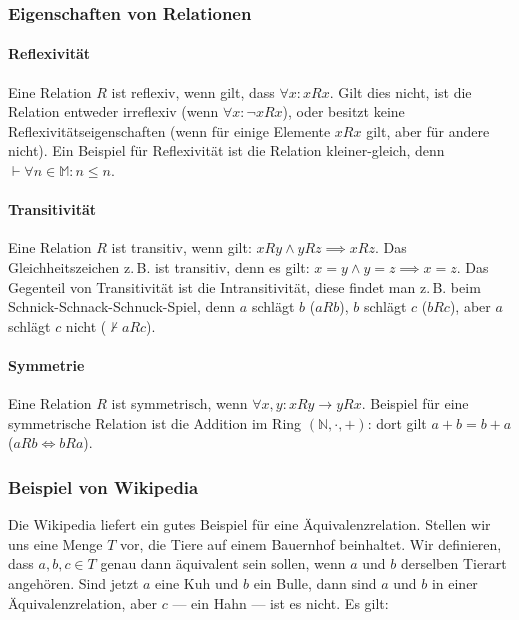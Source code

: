 \documentclass{scrartcl}
\begin{document}
\subsubsection{Eigenschaften von Relationen}

\paragraph{Reflexivität} Eine Relation $R$ ist reflexiv, wenn gilt, dass $\forall x: xRx$. Gilt dies nicht, ist die Relation entweder irreflexiv (wenn $\forall x: \lnot xRx$), oder 
besitzt keine Reflexivitätseigenschaften (wenn für einige Elemente $xRx$ gilt, aber für andere nicht).
Ein Beispiel für Reflexivität ist die Relation kleiner-gleich, denn $\vdash \forall n \in \mathbb{M}: n \leq n$.

\paragraph{Transitivität} Eine Relation $R$ ist transitiv, wenn gilt: $xRy \wedge yRz \implies xRz$. Das Gleichheitszeichen z.\,B. ist transitiv, denn
es gilt: $x = y \wedge y = z \implies x = z$. Das Gegenteil von Transitivität ist die Intransitivität, diese findet man z.\,B. beim Schnick-Schnack-Schnuck-Spiel,
denn $a$ schlägt $b$ ($aRb$), $b$ schlägt $c$ ($bRc$), aber $a$ schlägt $c$ nicht ($\not\vdash aRc$).

\paragraph{Symmetrie} Eine Relation $R$ ist symmetrisch, wenn $\forall x, y: xRy \longrightarrow yRx$. Beispiel für eine symmetrische Relation ist die Addition im
Ring $(\mathbb{N}, \cdot, +)$: dort gilt $a + b = b + a$ ($aRb \Leftrightarrow bRa$).

\subsubsection{Beispiel von Wikipedia}

Die Wikipedia liefert ein gutes Beispiel für eine Äquivalenzrelation.
Stellen wir uns eine Menge $T$ vor, die Tiere auf einem Bauernhof beinhaltet.
Wir definieren, dass $a, b, c \in T$ genau dann äquivalent sein sollen, wenn
$a$ und $b$ derselben Tierart angehören. 
Sind jetzt $a$ eine Kuh und $b$ ein Bulle, dann sind $a$ und $b$ in einer
Äquivalenzrelation, aber $c$ --- ein Hahn --- ist es nicht. Es gilt:
\end{document}

